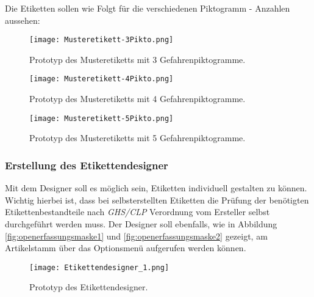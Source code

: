 \noindent
Die Etiketten sollen wie Folgt für die verschiedenen Piktogramm - Anzahlen aussehen:

\begin{figure}[H]
    \centering
    \texttt{[image: Musteretikett-3Pikto.png]}
    \caption[Prototyp des Musteretiketts mit 3 Gefahrenpiktogramme]
    {\small{Prototyp des Musteretiketts mit 3 Gefahrenpiktogramme. \cite{fzp}}}
    \label{fig:prototypmusteretikett3p}
\end{figure}

\begin{figure}[H]
    \centering
    \texttt{[image: Musteretikett-4Pikto.png]}
    \caption[Prototyp des Musteretiketts mit 4 Gefahrenpiktogramme]
    {\small{Prototyp des Musteretiketts mit 4 Gefahrenpiktogramme. \cite{fzp}}}
    \label{fig:prototypmusteretikett4p}
\end{figure}

\begin{figure}[H]
    \centering
    \texttt{[image: Musteretikett-5Pikto.png]}
    \caption[Prototyp des Musteretiketts mit 5 Gefahrenpiktogramme]
    {\small{Prototyp des Musteretiketts mit 5 Gefahrenpiktogramme. \cite{fzp}}}
    \label{fig:prototypmusteretikett5p}
\end{figure}

\subsubsection{Erstellung des Etikettendesigner}
Mit dem Designer soll es möglich sein, Etiketten individuell gestalten zu können. 
Wichtig hierbei ist, dass bei selbsterstellten Etiketten die Prüfung der benötigten 
Etikettenbestandteile nach \emph{GHS/CLP} Verordnung vom Ersteller selbst 
durchgeführt werden muss. Der Designer soll ebenfalls, wie in Abbildung 
\ref{fig:openerfassungsmaske1} und \ref{fig:openerfassungsmaske2}
gezeigt, am Artikelstamm über das Optionsmenü aufgerufen werden können. 

\begin{figure}[H]
    \centering
    \texttt{[image: Etikettendesigner\_1.png]}
    \caption[Prototyp des Etikettendesigner]
    {\small{Prototyp des Etikettendesigner. \cite{fzp}}}
    \label{fig:prototypetikettendesigner}
\end{figure}